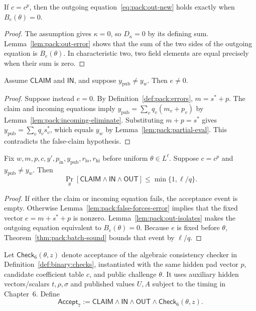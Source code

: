 \begin{lemma}\label{lem:pack:out-isolates}
If $c=c^p$, then the outgoing
equation~\eqref{eq:pack:out-new} holds
exactly when $B_e(\theta)=0$.
\end{lemma}
\begin{proof}
The assumption gives $\kappa=0$,
so $D_\kappa=0$ by its defining sum.
Lemma~\ref{lem:pack:out-error}
shows that the sum of the two
sides of the outgoing equation is
$B_e(\theta)$. In characteristic two,
two field elements are equal precisely
when their sum is zero.
\end{proof}

\begin{lemma}\label{lem:pack:false-forces-error}
Assume $\mathsf{CLAIM}$ and $\mathsf{IN}$,
and suppose
$y_{\mathrm{pub}}\neq y_w$.
Then $e\neq0$.
\end{lemma}
\begin{proof}
Suppose instead $e=0$.
By Definition~\ref{def:pack:errors},
$m=s^*+p$. The claim and
incoming equations imply
$y_{\mathrm{pub}}=\sum_vq_v(m_v+p_v)$
by Lemma~\ref{lem:pack:incoming-eliminate}.
Substituting $m+p=s^*$ gives
$y_{\mathrm{pub}}=\sum_vq_vs_v^*$,
which equals $y_w$ by
Lemma~\ref{lem:pack:partial-eval}.
This contradicts the false-claim hypothesis.
\end{proof}

\begin{theorem}\label{thm:pack:sound-exact}
Fix $w,m,p,c,y',p_{\mathrm{in}},
y_{\mathrm{pub}},r_{\mathrm{lo}},r_{\mathrm{hi}}$
before uniform $\theta\in L^\ell$.
Suppose $c=c^p$ and
$y_{\mathrm{pub}}\neq y_w$.
Then
\[
 \Pr_\theta[
 \mathsf{CLAIM}\land\mathsf{IN}
               \land\mathsf{OUT}]
 \leq \min\{1,\ell/q\}.
\]
\end{theorem}
\begin{proof}
If either the claim or incoming equation
fails, the acceptance event is empty.
Otherwise Lemma~\ref{lem:pack:false-forces-error}
implies that the fixed vector
$e=m+s^*+p$ is nonzero.
Lemma~\ref{lem:pack:out-isolates}
makes the outgoing equation equivalent
to $B_e(\theta)=0$.
Because $e$ is fixed before $\theta$,
Theorem~\ref{thm:pack:batch-sound}
bounds that event by $\ell/q$.
\end{proof}

\begin{definition}\label{def:pack:combined}
Let $\mathsf{Check}_{6}(\theta,z)$ denote
acceptance of the algebraic consistency
checker in Definition~\ref{def:binary:checks},
instantiated with the same hidden pad
vector $p$, candidate coefficient table $c$,
and public challenge $\theta$.
It uses auxiliary hidden vectors/scalars
$t,\rho,\sigma$ and published values $U,A$
subject to the timing in Chapter~6.
Define
\[
 \mathsf{Accept}_{7}:=
 \mathsf{CLAIM}\land\mathsf{IN}
 \land\mathsf{OUT}\land
 \mathsf{Check}_{6}(\theta,z).
\]
\end{definition}


